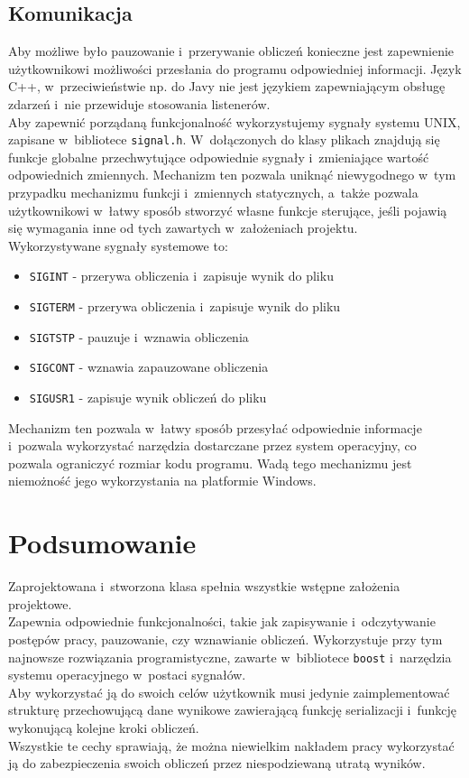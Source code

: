 \documentclass[a4paper]{article}
\begin{document}
\subsection{Komunikacja}
Aby możliwe było pauzowanie i~przerywanie obliczeń konieczne jest zapewnienie użytkownikowi możliwości przesłania do programu odpowiedniej informacji.
Język C++, w~przeciwieństwie np. do Javy nie jest językiem zapewniającym obsługę zdarzeń i~nie przewiduje stosowania listenerów.\\
Aby zapewnić porządaną funkcjonalność wykorzystujemy sygnały systemu UNIX, zapisane w~bibliotece \texttt{signal.h}.
W~dołączonych do klasy plikach znajdują się funkcje globalne przechwytujące odpowiednie sygnały i~zmieniające wartość odpowiednich zmiennych.
Mechanizm ten pozwala uniknąć niewygodnego w~tym przypadku mechanizmu funkcji i~zmiennych statycznych, a~także pozwala użytkownikowi w~łatwy sposób stworzyć własne funkcje sterujące, jeśli pojawią się wymagania inne od tych zawartych w~założeniach projektu.\\
Wykorzystywane sygnały systemowe to:
\begin{itemize}
\item \texttt{SIGINT} - przerywa obliczenia i~zapisuje wynik do pliku
\item \texttt{SIGTERM} - przerywa obliczenia i~zapisuje wynik do pliku
\item \texttt{SIGTSTP} - pauzuje i~wznawia obliczenia
\item \texttt{SIGCONT} - wznawia zapauzowane obliczenia
\item \texttt{SIGUSR1} - zapisuje wynik obliczeń do pliku
\end{itemize}
Mechanizm ten pozwala w~łatwy sposób przesyłać odpowiednie informacje i~pozwala wykorzystać narzędzia dostarczane przez system operacyjny, co pozwala ograniczyć rozmiar kodu programu.
Wadą tego mechanizmu jest niemożność jego wykorzystania na platformie Windows. 
\section{Podsumowanie}
Zaprojektowana i~stworzona klasa spełnia wszystkie wstępne założenia projektowe.\\
Zapewnia odpowiednie funkcjonalności, takie jak zapisywanie i~odczytywanie postępów pracy, pauzowanie, czy wznawianie obliczeń.
Wykorzystuje przy tym najnowsze rozwiązania programistyczne, zawarte w~bibliotece \texttt{boost} i~narzędzia systemu operacyjnego w~postaci sygnałów.\\
Aby wykorzystać ją do swoich celów użytkownik musi jedynie zaimplementować strukturę przechowującą dane wynikowe zawierającą funkcję serializacji i~funkcję wykonującą kolejne kroki obliczeń.\\
Wszystkie te cechy sprawiają, że można niewielkim nakładem pracy wykorzystać ją do zabezpieczenia swoich obliczeń przez niespodziewaną utratą wyników.
\end{document}
